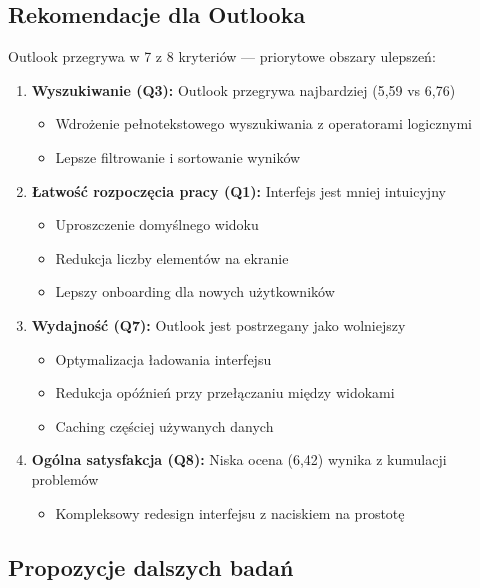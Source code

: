 \documentclass[12pt,a4paper]{article}
\begin{document}
\subsection{Rekomendacje dla Outlooka}

Outlook przegrywa w 7 z 8 kryteriów --- priorytowe obszary ulepszeń:

\begin{enumerate}
    \item \textbf{Wyszukiwanie (Q3):} Outlook przegrywa najbardziej (5,59 vs 6,76)
    \begin{itemize}[noitemsep]
        \item Wdrożenie pełnotekstowego wyszukiwania z operatorami logicznymi
        \item Lepsze filtrowanie i sortowanie wyników
    \end{itemize}

    \item \textbf{Łatwość rozpoczęcia pracy (Q1):} Interfejs jest mniej intuicyjny
    \begin{itemize}[noitemsep]
        \item Uproszczenie domyślnego widoku
        \item Redukcja liczby elementów na ekranie
        \item Lepszy onboarding dla nowych użytkowników
    \end{itemize}

    \item \textbf{Wydajność (Q7):} Outlook jest postrzegany jako wolniejszy
    \begin{itemize}[noitemsep]
        \item Optymalizacja ładowania interfejsu
        \item Redukcja opóźnień przy przełączaniu między widokami
        \item Caching częściej używanych danych
    \end{itemize}

    \item \textbf{Ogólna satysfakcja (Q8):} Niska ocena (6,42) wynika z kumulacji problemów
    \begin{itemize}[noitemsep]
        \item Kompleksowy redesign interfejsu z naciskiem na prostotę
    \end{itemize}
\end{enumerate}

\subsection{Propozycje dalszych badań}
\end{document}
